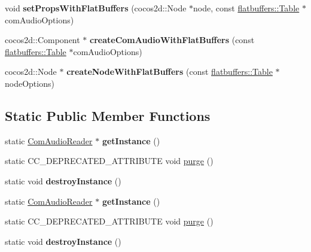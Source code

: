 \begin{DoxyCompactItemize}
\item 
\mbox{\label{classcocostudio_1_1ComAudioReader_a65b1aa581374eaa7fe5e62b7d99c2651}} 
void {\bfseries set\+Props\+With\+Flat\+Buffers} (cocos2d\+::\+Node $\ast$node, const \hyperlink{classflatbuffers_1_1Table}{flatbuffers\+::\+Table} $\ast$com\+Audio\+Options)
\item 
\mbox{\label{classcocostudio_1_1ComAudioReader_a5cc048912194ea4bac474fb63ac93d16}} 
cocos2d\+::\+Component $\ast$ {\bfseries create\+Com\+Audio\+With\+Flat\+Buffers} (const \hyperlink{classflatbuffers_1_1Table}{flatbuffers\+::\+Table} $\ast$com\+Audio\+Options)
\item 
\mbox{\label{classcocostudio_1_1ComAudioReader_a564586fcadd0102709db3cec81758bef}} 
cocos2d\+::\+Node $\ast$ {\bfseries create\+Node\+With\+Flat\+Buffers} (const \hyperlink{classflatbuffers_1_1Table}{flatbuffers\+::\+Table} $\ast$node\+Options)
\end{DoxyCompactItemize}
\subsection*{Static Public Member Functions}
\begin{DoxyCompactItemize}
\item 
\mbox{\label{classcocostudio_1_1ComAudioReader_a174f6988c8472fe9e9680c5bda99cc27}} 
static \hyperlink{classcocostudio_1_1ComAudioReader}{Com\+Audio\+Reader} $\ast$ {\bfseries get\+Instance} ()
\item 
static C\+C\+\_\+\+D\+E\+P\+R\+E\+C\+A\+T\+E\+D\+\_\+\+A\+T\+T\+R\+I\+B\+U\+TE void \hyperlink{classcocostudio_1_1ComAudioReader_ad26fecc90709cb7ab56fe06c62f738b5}{purge} ()
\item 
\mbox{\label{classcocostudio_1_1ComAudioReader_a9c6ff5bcb47e9e4be1726d11b6351338}} 
static void {\bfseries destroy\+Instance} ()
\item 
\mbox{\label{classcocostudio_1_1ComAudioReader_a47d3c62031a29f54eb66a0e8c379e740}} 
static \hyperlink{classcocostudio_1_1ComAudioReader}{Com\+Audio\+Reader} $\ast$ {\bfseries get\+Instance} ()
\item 
static C\+C\+\_\+\+D\+E\+P\+R\+E\+C\+A\+T\+E\+D\+\_\+\+A\+T\+T\+R\+I\+B\+U\+TE void \hyperlink{classcocostudio_1_1ComAudioReader_a73b04cfd102b40fdf4bf5a79700d253f}{purge} ()
\item 
\mbox{\label{classcocostudio_1_1ComAudioReader_a78904aa3dc66edcb0e5dec6fd60ab225}} 
static void {\bfseries destroy\+Instance} ()
\end{DoxyCompactItemize}


